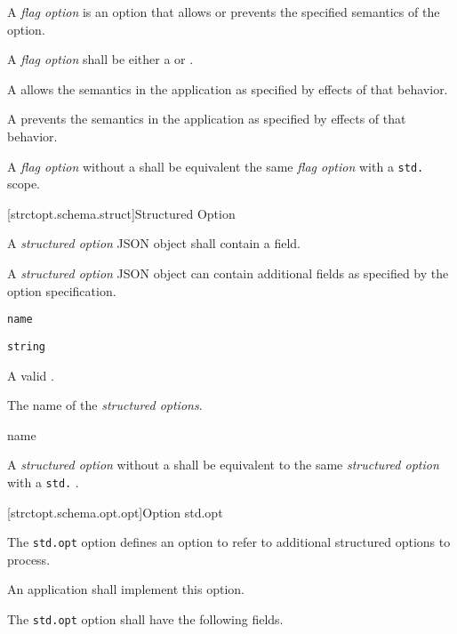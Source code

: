 \pnum
A \emph{flag option} is an option that allows or prevents the specified
semantics of the option.

\pnum
A \emph{flag option} shall be either a  or
.

\pnum
A  allows the semantics in the application as specified
by effects of that behavior.

\pnum
A  prevents the semantics in the application as specified
by effects of that behavior.

\pnum
A \emph{flag option} without a  shall be equivalent the same
\emph{flag option} with a \verb|std.| scope.

[strctopt.schema.struct]{Structured Option}

\pnum
A \emph{structured option} JSON object shall contain a
 field.

\pnum
A \emph{structured option} JSON object can contain additional fields as
specified by the option specification.

\begin{itemdescr}

	\pnum \fldname \verb|name|

	\pnum \fldtype \verb|string|

	\pnum \fldval
	A valid .

	\pnum \flddesc
	The name of the \emph{structured options}.

\end{itemdescr}

\pnum
\begin{ncbnf}

\br
	 name

\end{ncbnf}

\pnum
A \emph{structured option} without a  shall be equivalent to
the same \emph{structured option} with a \verb|std.| .

[strctopt.schema.opt.opt]{Option std.opt}

\pnum
The \verb|std.opt| option defines an option to refer to additional structured
options  to process.

\pnum
An application shall implement this option.

\pnum
The \verb|std.opt| option shall have the following fields.

